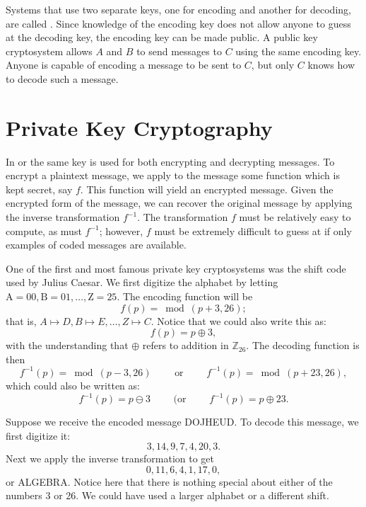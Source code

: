  
Systems that use two separate keys, one for encoding and another for
decoding, are called . Since
knowledge of the encoding key does not allow anyone to guess at the
decoding key, the encoding key can be made public. A public key
cryptosystem allows $A$ and $B$ to send messages to $C$ using the same
encoding key.  Anyone is capable of encoding a message to be sent to
$C$, but only $C$ knows how to decode such a message.
 
 
 
\section{Private Key Cryptography}
 
 
In  or
the same key is used for both encrypting and decrypting messages. To
encrypt a  plaintext message, we apply to the message some function
which is kept secret, say $f$. This function will yield an encrypted
message.  Given the encrypted form of the message, we can recover the
original message by applying the inverse transformation $f^{-1}$. The
transformation $f$ must be relatively easy to compute, as must
$f^{-1}$; however, $f$ must be extremely difficult to guess at if only
examples of coded messages are available.
 
 
\medskip
 
 
\begin{example}
One of the first and most famous private key cryptosystems was the
shift code used by Julius Caesar.  We first digitize the alphabet by
letting $\mbox{A}  = 00, \mbox{B}  = 01, \ldots, \mbox{Z} = 25$.
The encoding function will be 
$$
f(p) =\bmod( p + 3,  26);
$$
that is, $A \mapsto D, B \mapsto E, \ldots, Z \mapsto C$. Notice that we could also write this as:
$$
f(p) =p \oplus 3,
$$
with the understanding that $\oplus$ refers to addition in $\mathbb{Z}_{26}$.
The decoding
function is then 
$$
f^{-1}(p) = \bmod(p - 3,26) \qquad \textrm{ or } \qquad f^{-1}(p) = \bmod(p +23,26),
$$
which could also be written as:
$$
f^{-1}(p) = p \ominus 3 \qquad \textrm{ (or }\qquad f^{-1}(p) = p \oplus 23.
$$

Suppose we receive the encoded message DOJHEUD. To decode this
message, we first digitize it:  
$$
3, 14, 9, 7, 4, 20, 3.
$$
Next we apply the inverse transformation to get
$$
0, 11, 6, 4, 1, 17, 0,
$$
or ALGEBRA. Notice here that there is nothing special about either of
the numbers 3 or 26. We could have used a larger alphabet or a
different shift.
\mbox{\hspace{1in}}
\end{example}
 
